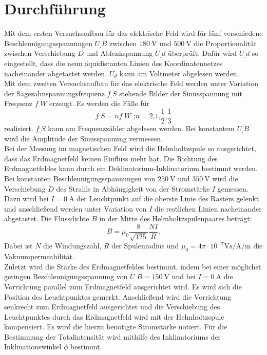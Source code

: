
\section{Durchführung}
\label{sec:Durchführung}

Mit dem ersten Versuchsaufbau für das elektrische Feld wird für fünf verschiedene Beschleunigungsspannungen $U_.B$ zwischen $\SI{180}{\volt}$ und $\SI{500}{\volt}$ die Proportionalität zwischen Verschiebung $D$ und Ablenkspannung $U_.d$ überprüft.
Dafür wird $U_.d$ so eingestellt, dass die neun äquidistanten Linien des Koordinatennetzes nacheinander abgetastet werden. $U_d$ kann am Voltmeter abgelesen werden.\\
Mit dem zweiten Versuchsaufbau für das elektrische Feld werden unter Variation der Sägezahnspannungsfrequenz $f_.S$ stehende Bilder der Sinusspannung mit Frequenz $f_.W$ erzeugt. Es werden die Fälle für 
\[
f_.S = nf_.W \text{ ;} n=2\text{,}1\text{,}\frac{1}{2}\text{,}\frac{1}{3}
\]
realisiert. $f_.S$ kann am Frequenzzähler abgelesen werden. 
Bei konstantem $U_.B$ wird die Amplitude der Sinusspannung vermessen.\\
Bei der Messung im magnetischen Feld wird die Helmholtzspule so ausgerichtet, dass das Erdmagnetfeld keinen Einfluss mehr hat. Die Richtung des Erdmagnetfeldes kann durch ein Deklinatorium-Inklinatorium bestimmt werden. Bei konstanten Beschleunigungsspannungen von $\SI{250}{\volt}$ und $\SI{350}{\volt}$ wird die Verschiebung $D$ des Strahls in Abhängigkeit von der Stromstärke $I$ gemessen. Dazu wird bei $I=\SI{0}{\ampere}$ der Leuchtpunkt auf die oberste Linie des Rasters gelenkt und anschließend werden unter Variation von $I$ die restlichen Linien nacheinander abgetastet. Die Flussdichte $B$ in der Mitte des Helmholtzspulenpaares beträgt:
\begin{equation}
B = \mu_0\frac{8}{\sqrt{125}}\frac{NI}{R}\text{.}\label{eq:B}
\end{equation}
Dabei ist $N$ die Windungszahl, $R$ der Spulenradius und $\mu_0=4\pi\cdot 10^{-7}\si{\volt\second\per\ampere\per\metre}$ die Vakuumpermeabilität.\\
Zuletzt wird die Stärke des Erdmagnetfeldes bestimmt, indem bei einer möglichst geringen Beschleunigungsspannung von $U_.B = \SI{150}{\volt}$ und bei $I=\SI{0}{\ampere}$ die Vorrichtung parallel zum Erdmagnetfeld ausgerichtet wird. Es wird sich die Position des Leuchtpunktes gemerkt. Anschließend wird die Vorrichtung senkrecht zum Erdmagnetfeld ausgerichtet und die Verschiebung des Leuchtpunktes durch das Erdmagnetfeld wird mit der Helmholtzspule kompensiert. Es wird die hierzu benötigte Stromstärke notiert.
Für die Bestimmung der Totalintensität wird mithilfe des Inklinatoriums der Inklinationswinkel $\phi$ bestimmt.    